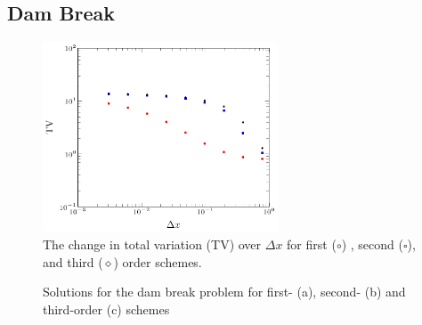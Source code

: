 \documentclass[SingleSpace,12pt]{Serre_ASCE}
\begin{document}
\subsection{Dam Break}
\begin{figure}[htb]
\begin{center}
\includegraphics[width=7.0cm]{./results/dambreak/L1con/both-figure0.pdf}
\end{center}
\caption{The change in total variation (TV) over $\Delta x$ for first ($\circ$) , second ($\square$), and third ($\diamond$) order schemes.}
\label{fig:DBL1}
\end{figure}
\begin{figure}[htb]
\centering
{}
\caption{Solutions for the dam break problem for first- (a), second- (b) and third-order (c) schemes}
\label{fig:DB}
\end{figure}
\end{document}
